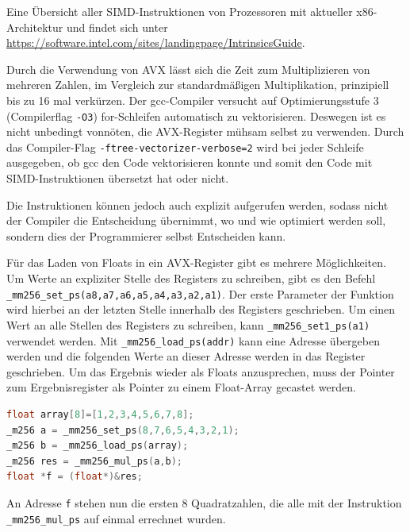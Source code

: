 \documentclass[../main.tex]{subfiles}
\begin{document}
Eine Übersicht aller SIMD-Instruktionen von Prozessoren mit aktueller x86-Architektur und findet sich unter \url{https://software.intel.com/sites/landingpage/IntrinsicsGuide}. 

Durch die Verwendung von AVX lässt sich die Zeit zum Multiplizieren von mehreren Zahlen, im Vergleich zur standardmäßigen Multiplikation, prinzipiell bis zu 16 mal verkürzen. Der gcc-Compiler versucht auf Optimierungsstufe 3 (Compilerflag \texttt{-O3}) for-Schleifen automatisch zu vektorisieren. Deswegen ist es nicht unbedingt vonnöten, die AVX-Register mühsam selbst zu verwenden. Durch das Compiler-Flag \texttt{-ftree-vectorizer-verbose=2} wird bei jeder Schleife ausgegeben, ob gcc den Code vektorisieren konnte und somit den Code mit SIMD-Instruktionen übersetzt hat oder nicht.

Die Instruktionen können jedoch auch explizit aufgerufen werden, sodass nicht der Compiler die Entscheidung übernimmt, wo und wie optimiert werden soll, sondern dies der Programmierer selbst Entscheiden kann. 

Für das Laden von Floats in ein AVX-Register gibt es mehrere Möglichkeiten. Um Werte an expliziter Stelle des Registers zu schreiben, gibt es den Befehl \texttt{\_mm256\_set\_ps(a8,a7,a6,a5,a4,a3,a2,a1)}. Der erste Parameter der Funktion wird hierbei an der letzten Stelle innerhalb des Registers geschrieben. Um einen Wert an alle Stellen des Registers zu schreiben, kann \texttt{\_mm256\_set1\_ps(a1)} verwendet werden. Mit \texttt{\_mm256\_load\_ps(addr)} kann eine Adresse übergeben werden und die folgenden Werte an dieser Adresse werden in das Register geschrieben. 
Um das Ergebnis wieder als Floats anzusprechen, muss der Pointer zum Ergebnisregister als Pointer zu einem Float-Array gecastet werden.

\begin{lstlisting}[language=c++, caption=Multiplikation mit AVX, captionpos=b, label=listing:avx, frame=single, linewidth=\textwidth, breaklines=true]
float array[8]=[1,2,3,4,5,6,7,8];
_m256 a = _mm256_set_ps(8,7,6,5,4,3,2,1);
_m256 b = _mm256_load_ps(array);
_m256 res = _mm256_mul_ps(a,b);
float *f = (float*)&res;
\end{lstlisting}
An Adresse \texttt{f} stehen nun die ersten 8 Quadratzahlen, die alle mit der Instruktion \texttt{\_mm256\_mul\_ps} auf einmal errechnet wurden.
\end{document}
